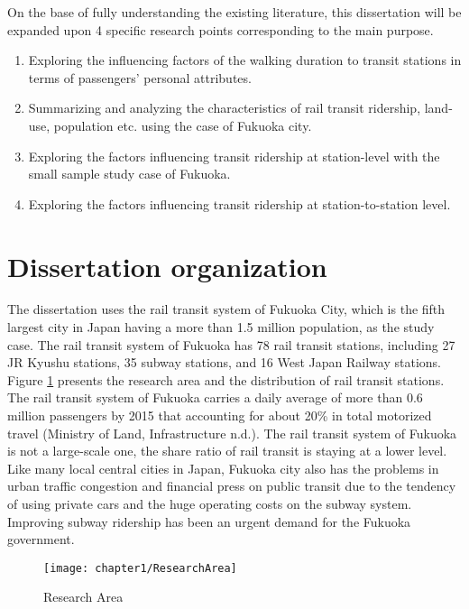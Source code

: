 On the base of fully understanding the existing literature, this dissertation will be expanded upon 4 specific research points corresponding to the main purpose.

\begin{enumerate}
	\setlength{\parskip}{0\baselineskip} %
	\item Exploring the influencing factors of the walking duration to transit stations in terms of passengers' personal attributes. 
	\item Summarizing and analyzing the characteristics of rail transit ridership, land-use, population etc. using the case of Fukuoka city.
	\item Exploring the factors influencing transit ridership at station-level with the small sample study case of Fukuoka. 
	\item Exploring the factors influencing transit ridership at station-to-station level.
	\setlength{\parskip}{0.7\baselineskip} %
\end{enumerate}

%
\section{Dissertation organization}
The dissertation uses the rail transit system of Fukuoka City, which is the fifth largest city in Japan having a more than 1.5 million population, as the study case. The rail transit system of Fukuoka has 78 rail transit stations, including 27 JR Kyushu stations, 35 subway stations, and 16 West Japan Railway stations. Figure \ref{fig:chp1:ResearchArea} presents the research area and the distribution of rail transit stations. The rail transit system of Fukuoka carries a daily average of more than 0.6 million passengers by 2015 that accounting for about 20\% in total motorized travel (Ministry of Land, Infrastructure n.d.). The rail transit system of Fukuoka is not a large-scale one, the share ratio of rail transit is staying at a lower level. Like many local central cities in Japan, Fukuoka city also has the problems in urban traffic congestion and financial press on public transit due to the tendency of using private cars and the huge operating costs on the subway system. Improving subway ridership has been an urgent demand for the Fukuoka government.

\begin{figure}[htbp]
	\centering
	\texttt{[image: chapter1/ResearchArea]}
	\caption{Research Area}
	\label{fig:chp1:ResearchArea}
\end{figure}

